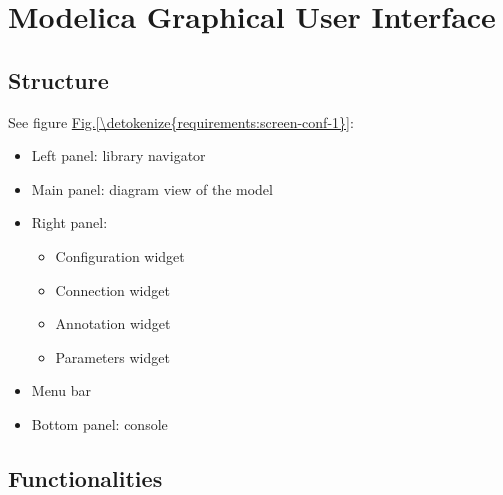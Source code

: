 \documentclass[letterpaper,10pt, openany,english]{sphinxmanual}
\begin{document}
\section{Modelica Graphical User Interface}
\label{\detokenize{requirements:modelica-graphical-user-interface}}

\subsection{Structure}
\label{\detokenize{requirements:structure}}
See figure \hyperref[\detokenize{requirements:screen-conf-1}]{Fig.\@ \ref{\detokenize{requirements:screen-conf-1}}}:
\begin{itemize}
\item {} 
Left panel: library navigator

\item {} 
Main panel: diagram view of the model

\item {} 
Right panel:
\begin{itemize}
\item {} 
Configuration widget

\item {} 
Connection widget

\item {} 
Annotation widget

\item {} 
Parameters widget

\end{itemize}

\item {} 
Menu bar

\item {} 
Bottom panel: console

\end{itemize}


\subsection{Functionalities}
\label{\detokenize{requirements:functionalities}}
\end{document}
